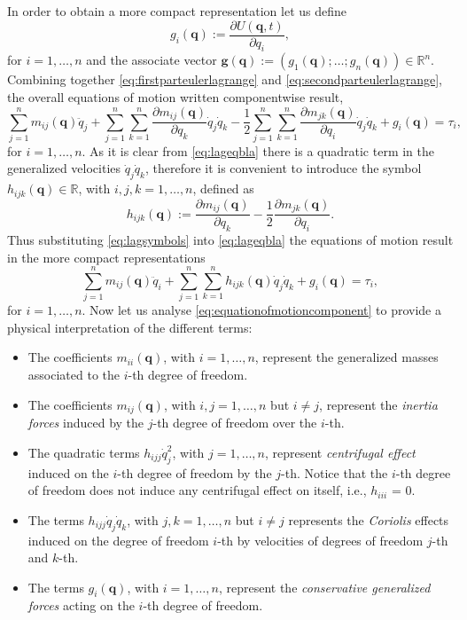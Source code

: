 		In order to obtain a more compact representation let us define 
		\begin{equation*}
			g_{i}(\bm{q}) := \frac{\partial U(\bm{q},t)}{\partial q_{i}},
		\end{equation*}
		for $i=1,\dots,n$ and the associate vector $\bm{g}(\bm{q}):=(g_{1}(\bm{q});\dots;g_{n}(\bm{q}))\in\mathbb{R}^{n}$. Combining together \cref{eq:firstparteulerlagrange} and \cref{eq:secondparteulerlagrange}, the overall equations of motion written componentwise result,
		\begin{equation}
			\label{eq:lageqbla}
			\sum_{j=1}^{n}m_{ij}(\bm{q})\ddot{q}_{j} + \sum_{j=1}^{n}\sum_{k=1}^{n}\frac{\partial m_{ij}(\bm{q})}{\partial q_{k}}\dot{q}_{j}\dot{q}_{k} -\frac{1}{2}\sum_{j=1}^{n}\sum_{k=1}^{n}\frac{\partial m_{jk}(\bm{q})}{\partial q_{i}}\dot{q}_{j}\dot{q}_{k}+g_{i}(\bm{q}) = \tau_{i},
		\end{equation}
		for $i=1,\dots,n$. As it is clear from \cref{eq:lageqbla} there is a quadratic term in the generalized velocities $\dot{q}_{j}\dot{q}_{k}$, therefore it is convenient to introduce the symbol $h_{ijk}(\bm{q})\in\mathbb{R}$, with $i,j,k = 1,\dots,n$, defined as
		\begin{equation}
			\label{eq:lagsymbols}
			h_{ijk}(\bm{q}) := \frac{\partial m_{ij}(\bm{q})}{\partial q_{k}}-\frac{1}{2}\frac{\partial m_{jk}(\bm{q})}{\partial q_{i}}. 
		\end{equation}
		Thus substituting \cref{eq:lagsymbols} into \cref{eq:lageqbla} the equations of motion result in the more compact representations
		\begin{equation}
			\label{eq:equationofmotioncomponent}
			\sum_{j=1}^{n}m_{ij}(\bm{q})\ddot{q}_{i} + \sum_{j=1}^{n}\sum_{k=1}^{n}h_{ijk}(\bm{q})\dot{q}_{j}\dot{q}_{k} + g_{i}(\bm{q}) = \tau_{i},
		\end{equation}
		for $i=1,\dots,n$. Now let us analyse \cref{eq:equationofmotioncomponent} to provide a physical interpretation of the different terms:
		\begin{itemize}
			\item The coefficients $m_{ii}(\bm{q})$, with $i =1,\dots,n$, represent the generalized masses associated to the $i$-th degree of freedom.
			\item The coefficients  $m_{ij}(\bm{q})$, with $i,j =1,\dots,n$ but $i\neq j$, represent the \emph{inertia forces} induced by the $j$-th degree of freedom over the $i$-th. 
			\item The quadratic terms $h_{ijj}\dot{q}_{j}^{2}$, with $j = 1,\dots,n$, represent \emph{centrifugal effect} induced on the $i$-th degree of freedom by the $j$-th. Notice that the $i$-th degree of freedom does not induce any centrifugal effect on itself, i.e., $h_{iii}$ = 0.
			\item The terms $h_{ijj}\dot{q}_{j}\dot{q}_{k}$, with $j,k=1,\dots,n$ but $i\neq j$ represents the \emph{Coriolis} effects induced on the degree of freedom $i$-th by velocities of degrees of freedom $j$-th and $k$-th.
			\item The terms $g_{i}(\bm{q})$, with $i=1,\dots,n$, represent the \emph{conservative generalized forces} acting on the $i$-th degree of freedom.
		\end{itemize}
